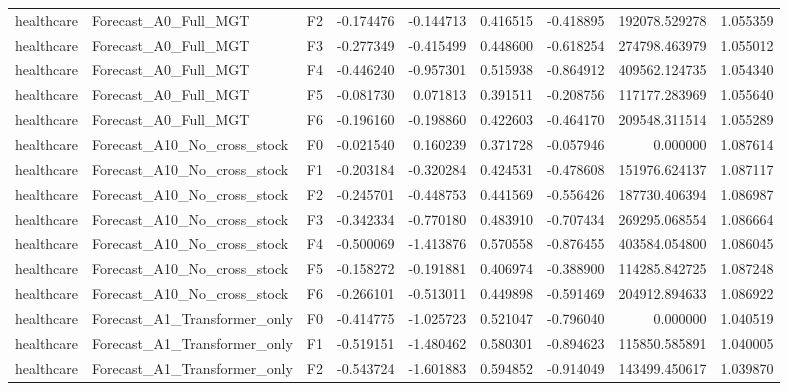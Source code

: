 \begin{tabular}{lllrrrrrr}
healthcare &         Forecast\_A0\_Full\_MGT &  F2 & -0.174476 & -0.144713 & 0.416515 & -0.418895 &    192078.529278 &             1.055359 \\
healthcare &         Forecast\_A0\_Full\_MGT &  F3 & -0.277349 & -0.415499 & 0.448600 & -0.618254 &    274798.463979 &             1.055012 \\
healthcare &         Forecast\_A0\_Full\_MGT &  F4 & -0.446240 & -0.957301 & 0.515938 & -0.864912 &    409562.124735 &             1.054340 \\
healthcare &         Forecast\_A0\_Full\_MGT &  F5 & -0.081730 &  0.071813 & 0.391511 & -0.208756 &    117177.283969 &             1.055640 \\
healthcare &         Forecast\_A0\_Full\_MGT &  F6 & -0.196160 & -0.198860 & 0.422603 & -0.464170 &    209548.311514 &             1.055289 \\
healthcare &  Forecast\_A10\_No\_cross\_stock &  F0 & -0.021540 &  0.160239 & 0.371728 & -0.057946 &         0.000000 &             1.087614 \\
healthcare &  Forecast\_A10\_No\_cross\_stock &  F1 & -0.203184 & -0.320284 & 0.424531 & -0.478608 &    151976.624137 &             1.087117 \\
healthcare &  Forecast\_A10\_No\_cross\_stock &  F2 & -0.245701 & -0.448753 & 0.441569 & -0.556426 &    187730.406394 &             1.086987 \\
healthcare &  Forecast\_A10\_No\_cross\_stock &  F3 & -0.342334 & -0.770180 & 0.483910 & -0.707434 &    269295.068554 &             1.086664 \\
healthcare &  Forecast\_A10\_No\_cross\_stock &  F4 & -0.500069 & -1.413876 & 0.570558 & -0.876455 &    403584.054800 &             1.086045 \\
healthcare &  Forecast\_A10\_No\_cross\_stock &  F5 & -0.158272 & -0.191881 & 0.406974 & -0.388900 &    114285.842725 &             1.087248 \\
healthcare &  Forecast\_A10\_No\_cross\_stock &  F6 & -0.266101 & -0.513011 & 0.449898 & -0.591469 &    204912.894633 &             1.086922 \\
healthcare & Forecast\_A1\_Transformer\_only &  F0 & -0.414775 & -1.025723 & 0.521047 & -0.796040 &         0.000000 &             1.040519 \\
healthcare & Forecast\_A1\_Transformer\_only &  F1 & -0.519151 & -1.480462 & 0.580301 & -0.894623 &    115850.585891 &             1.040005 \\
healthcare & Forecast\_A1\_Transformer\_only &  F2 & -0.543724 & -1.601883 & 0.594852 & -0.914049 &    143499.450617 &             1.039870 \\

\end{tabular}
